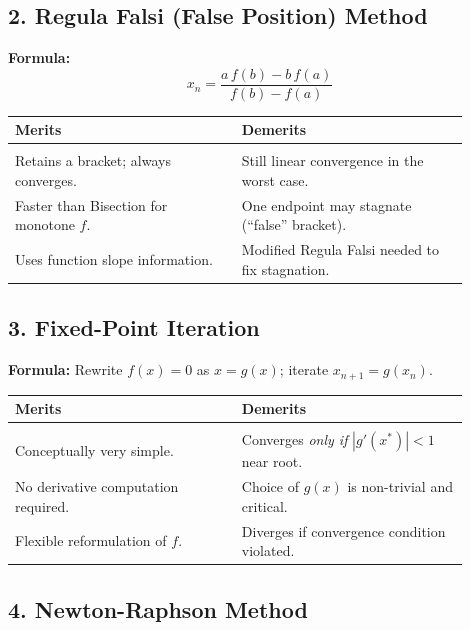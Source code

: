 \documentclass[12pt]{article}
\begin{document}
\vspace{8pt}
\subsection*{2. Regula Falsi (False Position) Method}

\textbf{Formula:}
\[
  x_n = \frac{a\,f(b) - b\,f(a)}{f(b) - f(a)}
\]

\begin{observebox}
\begin{tabular}{p{0.45\linewidth} p{0.45\linewidth}}
\textbf{Merits} & \textbf{Demerits} \\[2pt]
\hline\\[-6pt]
Retains a bracket; always converges. & Still linear convergence in the worst case. \\
Faster than Bisection for monotone $f$. & One endpoint may stagnate (``false'' bracket). \\
Uses function slope information. & Modified Regula Falsi needed to fix stagnation. \\
\end{tabular}
\end{observebox}

\vspace{8pt}
\subsection*{3. Fixed-Point Iteration}

\textbf{Formula:} Rewrite $f(x)=0$ as $x=g(x)$; iterate $x_{n+1} = g(x_n)$.

\begin{observebox}
\begin{tabular}{p{0.45\linewidth} p{0.45\linewidth}}
\textbf{Merits} & \textbf{Demerits} \\[2pt]
\hline\\[-6pt]
Conceptually very simple. & Converges \emph{only if} $|g'(x^*)| < 1$ near root. \\
No derivative computation required. & Choice of $g(x)$ is non-trivial and critical. \\
Flexible reformulation of $f$. & Diverges if convergence condition violated. \\
\end{tabular}
\end{observebox}

\vspace{8pt}
\subsection*{4. Newton-Raphson Method}
\end{document}
